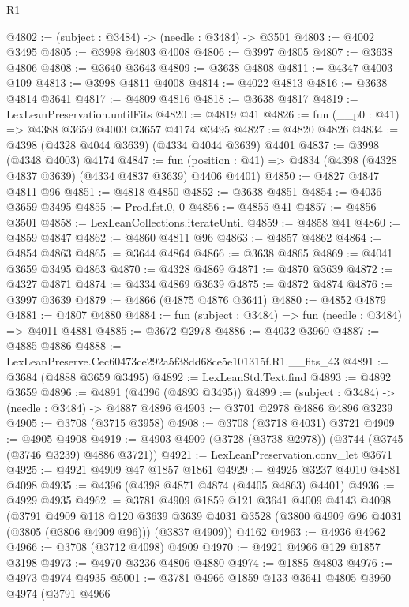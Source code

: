 \begin{lexlean}{R1}
\begin{coremodule}
@4802 := (subject : @3484) -> (needle : @3484) -> @3501
@4803 := @4002 @3495
@4805 := @3998 @4803 @4008
@4806 := @3997 @4805
@4807 := @3638 @4806
@4808 := @3640 @3643
@4809 := @3638 @4808
@4811 := @4347 @4003 @109
@4813 := @3998 @4811 @4008
@4814 := @4022 @4813
@4816 := @3638 @4814 @3641
@4817 := @4809 @4816
@4818 := @3638 @4817
@4819 := LexLeanPreservation.untilFits
@4820 := @4819 @41
@4826 := fun (__p0 : @41) => @4388 @3659 @4003 @3657 @4174 @3495
@4827 := @4820 @4826
@4834 := @4398 (@4328 @4044 @3639) (@4334 @4044 @3639) @4401
@4837 := @3998 (@4348 @4003) @4174
@4847 := fun (position : @41) => @4834 (@4398 (@4328 @4837 @3639) (@4334 @4837 @3639) @4406 @4401)
@4850 := @4827 @4847 @4811 @96
@4851 := @4818 @4850
@4852 := @3638 @4851
@4854 := @4036 @3659 @3495
@4855 := Prod.fst.{0, 0}
@4856 := @4855 @41
@4857 := @4856 @3501
@4858 := LexLeanCollections.iterateUntil
@4859 := @4858 @41
@4860 := @4859 @4847
@4862 := @4860 @4811 @96
@4863 := @4857 @4862
@4864 := @4854 @4863
@4865 := @3644 @4864
@4866 := @3638 @4865
@4869 := @4041 @3659 @3495 @4863
@4870 := @4328 @4869
@4871 := @4870 @3639
@4872 := @4327 @4871
@4874 := @4334 @4869 @3639
@4875 := @4872 @4874
@4876 := @3997 @3639
@4879 := @4866 (@4875 @4876 @3641)
@4880 := @4852 @4879
@4881 := @4807 @4880
@4884 := fun (subject : @3484) => fun (needle : @3484) => @4011 @4881
@4885 := @3672 @2978
@4886 := @4032 @3960
@4887 := @4885 @4886
@4888 := LexLeanPreserve.Cec60473ce292a5f38dd68ce5e101315f.R1.__fits_43
@4891 := @3684 (@4888 @3659 @3495)
@4892 := LexLeanStd.Text.find
@4893 := @4892 @3659
@4896 := @4891 (@4396 (@4893 @3495))
@4899 := (subject : @3484) -> (needle : @3484) -> @4887 @4896
@4903 := @3701 @2978 @4886 @4896 @3239
@4905 := @3708 (@3715 @3958)
@4908 := @3708 (@3718 @4031) @3721
@4909 := @4905 @4908
@4919 := @4903 @4909 (@3728 (@3738 @2978)) (@3744 (@3745 (@3746 @3239) @4886 @3721))
@4921 := LexLeanPreservation.conv_let @3671
@4925 := @4921 @4909 @47 @1857 @1861
@4929 := @4925 @3237 @4010 @4881 @4098
@4935 := @4396 (@4398 @4871 @4874 (@4405 @4863) @4401)
@4936 := @4929 @4935
@4962 := @3781
    @4909
    @1859
    @121
    @3641
    @4009
    @4143
    @4098
    (@3791
      @4909
      @118
      @120
      @3639
      @3639
      @4031
      @3528
      (@3800 @4909 @96 @4031 (@3805 (@3806 @4909 @96)))
      (@3837 @4909))
    @4162
@4963 := @4936 @4962
@4966 := @3708 (@3712 @4098) @4909
@4970 := @4921 @4966 @129 @1857 @3198
@4973 := @4970 @3236 @4806 @4880
@4974 := @1885 @4803
@4976 := @4973 @4974 @4935
@5001 := @3781
    @4966
    @1859
    @133
    @3641
    @4805
    @3960
    @4974
    (@3791
      @4966

\end{coremodule}
\end{lexlean}
